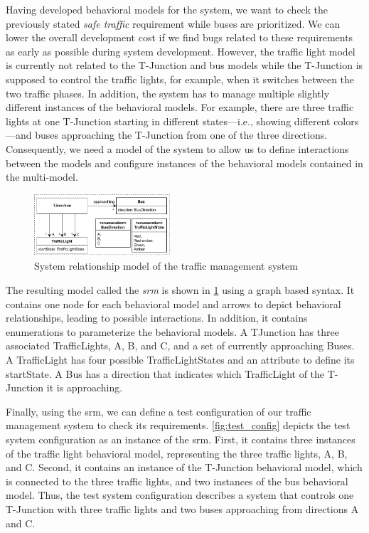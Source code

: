 \documentclass{jot}
\begin{document}
Having developed behavioral models for the system, we want to check the previously stated \emph{safe traffic} requirement while buses are prioritized.
We can lower the overall development cost if we find bugs related to these requirements as early as possible during system development.
However, the traffic light model is currently not related to the T-Junction and bus models while the T-Junction is supposed to control the traffic lights, for example, when it switches between the two traffic phases.
In addition, the system has to manage multiple slightly different instances of the behavioral models.
For example, there are three traffic lights at one T-Junction starting in different states---i.e., showing different colors---and buses approaching the T-Junction from one of the three directions.
Consequently, we need a model of the system to allow us to define interactions between the models and configure instances of the behavioral models contained in the multi-model.

\begin{figure}[h]
    \centering
    \includegraphics[width=0.45\textwidth]{figures/systemRelationShipModel.pdf}
    \caption{System relationship model of the traffic management system}
    \label{fig:systemRelationshipModel}
\end{figure}

The resulting model called the \emph{\gls*{srm}} is shown in \cref{fig:systemRelationshipModel} using a graph based syntax.
It contains one node for each behavioral model and arrows to depict behavioral relationships, leading to possible interactions.
In addition, it contains enumerations to parameterize the behavioral models. 
A \textsf{TJunction} has three associated \textsf{TrafficLight}s, \textsf{A}, \textsf{B}, and \textsf{C}, and a set of currently approaching \textsf{Bus}es.
A \textsf{TrafficLight} has four possible \textsf{TrafficLightState}s and an attribute to define its \textsf{startState}.
A \textsf{Bus} has a \textsf{direction} that indicates which \textsf{TrafficLight} of the T-Junction it is approaching.

Finally, using the \gls*{srm}, we can define a test configuration of our traffic management system to check its requirements.
\autoref{fig:test_config} depicts the test system configuration as an instance of the \gls*{srm}.
First, it contains three instances of the traffic light behavioral model, representing the three traffic lights, \textsf{A}, \textsf{B}, and \textsf{C}.
Second, it contains an instance of the T-Junction behavioral model, which is connected to the three traffic lights, and two instances of the bus behavioral model.
Thus, the test system configuration describes a system that controls one T-Junction with three traffic lights and two buses approaching from directions A and C.
\end{document}
